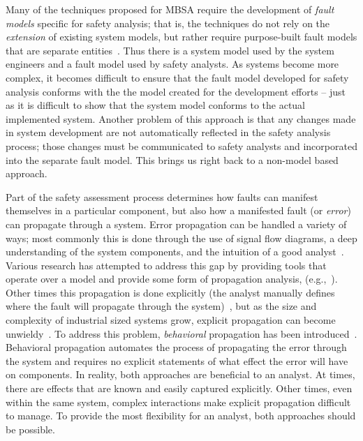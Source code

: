 Many of the techniques proposed for MBSA require the development of {\em fault models} specific for safety analysis; that is, the techniques do not rely on the \emph{extension} of existing system models, but rather require purpose-built fault models that are separate entities~\cite{symbAltaRica, DBLP:conf/tacas/BittnerBCCGGMMZ16, info8010007, Gudemann:2010:FQQ:1909626.1909813}. Thus there is a system model used by the system engineers and a fault model used by safety analysts. %
As systems become more complex, it becomes difficult to ensure that the fault model developed for safety analysis conforms with the the model created for the development efforts -- just as it is difficult to show that the system model conforms to the actual implemented system. Another problem of this approach is that any changes made in system development are not automatically reflected in the safety analysis process; those changes must be communicated to safety analysts and incorporated into the separate fault model. This brings us right back to a non-model based approach.

Part of the safety assessment process determines how faults can manifest themselves in a particular component, but also how a manifested fault (or \emph{error}) can propagate through a system. Error propagation can be handled a variety of ways; most commonly this is done through the use of signal flow diagrams, a deep understanding of the system components, and the intuition of a good analyst~\cite{lisagor2010failure}. Various research has attempted to address this gap by providing tools that operate over a model and provide some form of propagation analysis, (e.g.,~\cite{EMV2, Joshi05:SafeComp, DBLP:conf/tacas/BittnerBCCGGMMZ16}). Other times this propagation is done explicitly (the analyst manually defines where the fault will propagate through the system)~\cite{lisagor2011model}, but as the size and complexity of industrial sized systems grow, explicit propagation can become unwieldy~\cite{Stewart17:IMBSA}. To address this problem, \emph{behavioral} propagation has been introduced~\cite{DBLP:conf/tacas/BittnerBCCGGMMZ16,stewart2020safety}. Behavioral propagation automates the process of propagating the error through the system and requires no explicit statements of what effect the error will have on components. In reality, both approaches are beneficial to an analyst. At times, there are effects that are known and easily captured explicitly. Other times, even within the same system, complex interactions make explicit propagation difficult to manage. To provide the most flexibility for an analyst, both approaches should be possible.

